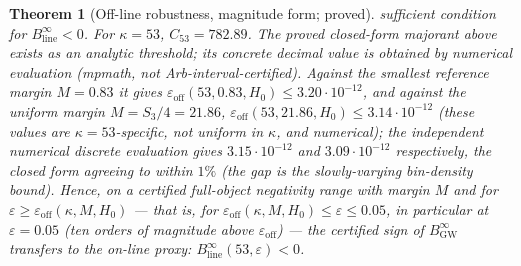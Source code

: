 \documentclass[11pt]{article}
\newtheorem{theorem}{Theorem}[section]
\newcommand{\BinfGW}{B_{\mathrm{GW}}^{\infty}}   %
\newcommand{\Binfline}{B_{\mathrm{line}}^{\infty}} %
\begin{document}
\begin{theorem}[Off-line robustness, magnitude form; proved]
sufficient condition for $\Binfline<0$.
For $\kappa=53$, $C_{53}=782.89$. The proved closed-form majorant above
\emph{exists} as an analytic threshold; its concrete decimal value is obtained
by numerical evaluation (mpmath, not Arb-interval-certified). Against
the smallest reference margin $M=0.83$ it gives
$\varepsilon_{\mathrm{off}}(53,0.83,H_0)\le 3.20\cdot10^{-12}$, and against the uniform
margin $M=S_3/4=21.86$,
$\varepsilon_{\mathrm{off}}(53,21.86,H_0)\le 3.14\cdot10^{-12}$
(these values are $\kappa=53$-specific, not uniform in $\kappa$, and
numerical); the independent numerical discrete evaluation gives
$3.15\cdot10^{-12}$ and $3.09\cdot10^{-12}$
respectively, the closed form agreeing to within $1\%$ (the gap is the
slowly-varying bin-density bound).
Hence, on a certified full-object negativity range with margin $M$ and for
$\varepsilon\ge\varepsilon_{\mathrm{off}}(\kappa,M,H_0)$ --- that is, for
$\varepsilon_{\mathrm{off}}(\kappa,M,H_0)\le\varepsilon\le 0.05$, in particular at
$\varepsilon=0.05$ (ten orders of magnitude above
$\varepsilon_{\mathrm{off}}$) --- the certified sign of $\BinfGW$ transfers
to the on-line proxy: $\Binfline(53,\varepsilon)<0$.
\end{theorem}
\end{document}
